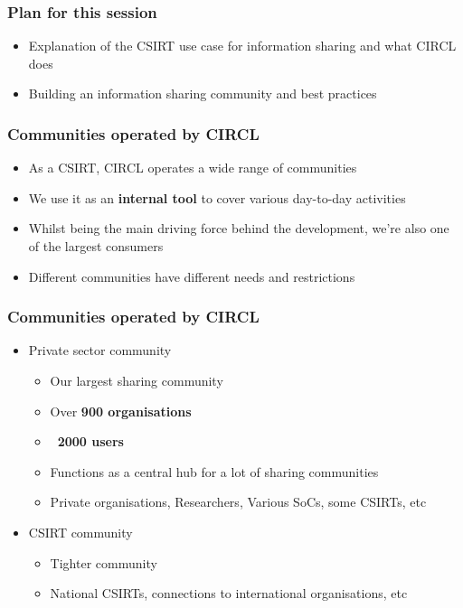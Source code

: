 
\begin{frame}[t,plain]
\titlepage
\end{frame}

\begin{frame}
	\frametitle{Plan for this session}
	\begin{itemize}
		\item Explanation of the CSIRT use case for information sharing and what CIRCL does
		\item Building an information sharing community and best practices
	\end{itemize}
\end{frame}

\begin{frame}
\frametitle{Communities operated by CIRCL}
\begin{itemize}
        \item As a CSIRT, CIRCL operates a wide range of communities
        \item We use it as an {\bf internal tool} to cover various day-to-day activities
        \item Whilst being the main driving force behind the development, we're also one of the largest consumers
	\item Different communities have different needs and restrictions
\end{itemize}
\end{frame}

\begin{frame}
\frametitle{Communities operated by CIRCL}
\begin{itemize}
        \item Private sector community
	\begin{itemize}
		\item Our largest sharing community
		\item Over {\bf 900 organisations}
		\item {\bf ~2000 users}
		\item Functions as a central hub for a lot of sharing communities
		\item Private organisations, Researchers, Various SoCs, some CSIRTs, etc
	\end{itemize}
	\item CSIRT community
	\begin{itemize}
		\item Tighter community
		\item National CSIRTs, connections to international organisations, etc
	\end{itemize}
\end{itemize}
\end{frame}

